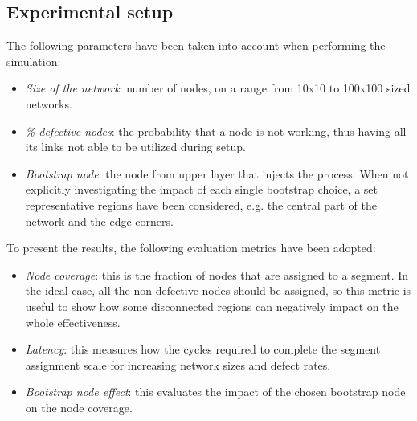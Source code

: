 \subsection{Experimental setup}
The following parameters have been taken into account when
performing the \disr{} simulation:
\begin{itemize}
\item {\emph{Size of the network}}: number of nodes, on a range from
10x10 to 100x100 sized networks. 
\item {\emph{\% defective nodes}}: the probability that a node is not
working, thus having all its links not able to be utilized during \disr{} setup.  
\item {\emph{Bootstrap node}}: the node from upper layer that
injects the \disr{} process. When not explicitly investigating the
impact of each single bootstrap choice, a set representative regions have been
considered, e.g. the central part of the network and the edge corners.
\end{itemize}
To present the results, the following evaluation metrics have been adopted:
\begin{itemize}
\item{\emph{Node coverage}}: this is the fraction of nodes that
are assigned to a segment. In the ideal case, all the non defective
nodes should be assigned, so this metric is useful to show how some
disconnected regions can negatively impact on the whole \disr{}
effectiveness.
\item{\emph{Latency}}: this measures how the cycles required to complete the
segment assignment scale for increasing network sizes and defect rates.
\item{\emph{Bootstrap node effect}}: this evaluates the impact of the chosen
bootstrap node on the node coverage.
\end{itemize}


